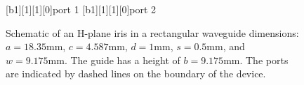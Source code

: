 \begin{figure}[!h]
 \centering
 [b1][1][1][0]{port 1}
 [b1][1][1][0]{port 2}
 {}
 \caption{Schematic of an H-plane iris in a rectangular waveguide dimensions: $a=18.35\text{mm}$, $c=4.587\text{mm}$, $d=1\text{mm}$, $s=0.5\text{mm}$, and $w=9.175\text{mm}$. The guide has a height of $b=9.175\text{mm}$. The ports are indicated by dashed lines on the boundary of the device.}
 \label{fig:h_plane_iris}
\end{figure}

